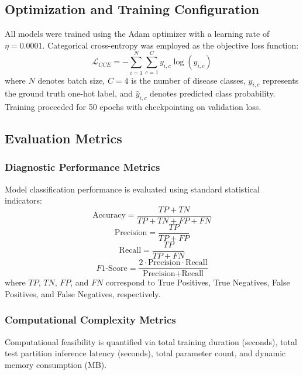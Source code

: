 \documentclass{ijcaArticle}
\begin{document}
\subsection{Optimization and Training Configuration}
All models were trained using the Adam optimizer with a learning rate of $\eta = 0.0001$. Categorical cross-entropy was employed as the objective loss function:
\begin{equation}
    \mathcal{L}_{CCE} = -\sum_{i=1}^{N} \sum_{c=1}^{C} y_{i,c} \log(\hat{y}_{i,c})
\end{equation}
where $N$ denotes batch size, $C=4$ is the number of disease classes, $y_{i,c}$ represents the ground truth one-hot label, and $\hat{y}_{i,c}$ denotes predicted class probability. Training proceeded for 50 epochs with checkpointing on validation loss.

\subsection{Evaluation Metrics}

\subsubsection{Diagnostic Performance Metrics}
Model classification performance is evaluated using standard statistical indicators:
\begin{equation}
    \text{Accuracy} = \frac{TP + TN}{TP + TN + FP + FN}
    \label{eq:accuracy}
\end{equation}
\begin{equation}
    \text{Precision} = \frac{TP}{TP + FP}
    \label{eq:precision}
\end{equation}
\begin{equation}
    \text{Recall} = \frac{TP}{TP + FN}
    \label{eq:recall}
\end{equation}
\begin{equation}
    F1\text{-Score} = \frac{2 \cdot \text{Precision} \cdot \text{Recall}}{\text{Precision} + \text{Recall}}
    \label{eq:f1score}
\end{equation}
where $TP$, $TN$, $FP$, and $FN$ correspond to True Positives, True Negatives, False Positives, and False Negatives, respectively.

\subsubsection{Computational Complexity Metrics}
Computational feasibility is quantified via total training duration (seconds), total test partition inference latency (seconds), total parameter count, and dynamic memory consumption (MB).
\end{document}
